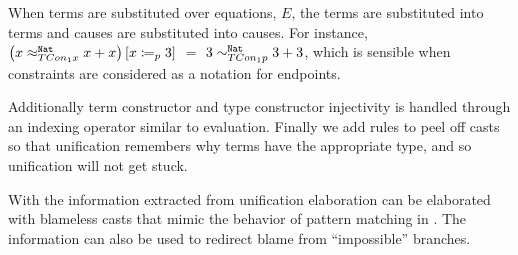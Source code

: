 
When terms are substituted over equations, $E$, the terms are substituted into terms and causes are substituted into causes.
For instance, 
  $\left(x \approx_{TCon_{1}x}^{\mathtt{Nat}{}}x+x\right) \left[x\coloneqq_{p} 3\right]$ $=$ $3 \sim_{TCon_{1}p}^{\mathtt{Nat}{}}3+3$,
  which is sensible when constraints are considered as a notation for endpoints.

Additionally term constructor and type constructor injectivity is handled through an indexing operator similar to evaluation.
Finally we add rules to peel off casts so that unification remembers why terms have the appropriate type, and so unification will not get stuck.

With the information extracted from unification elaboration can be elaborated with blameless casts that mimic the behavior of pattern matching in .
The information can also be used to redirect blame from ``impossible'' branches.
